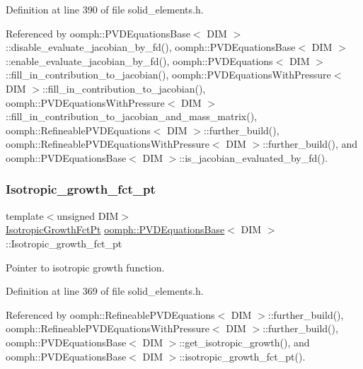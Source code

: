 Definition at line 390 of file solid\+\_\+elements.\+h.



Referenced by oomph\+::\+P\+V\+D\+Equations\+Base$<$ D\+I\+M $>$\+::disable\+\_\+evaluate\+\_\+jacobian\+\_\+by\+\_\+fd(), oomph\+::\+P\+V\+D\+Equations\+Base$<$ D\+I\+M $>$\+::enable\+\_\+evaluate\+\_\+jacobian\+\_\+by\+\_\+fd(), oomph\+::\+P\+V\+D\+Equations$<$ D\+I\+M $>$\+::fill\+\_\+in\+\_\+contribution\+\_\+to\+\_\+jacobian(), oomph\+::\+P\+V\+D\+Equations\+With\+Pressure$<$ D\+I\+M $>$\+::fill\+\_\+in\+\_\+contribution\+\_\+to\+\_\+jacobian(), oomph\+::\+P\+V\+D\+Equations\+With\+Pressure$<$ D\+I\+M $>$\+::fill\+\_\+in\+\_\+contribution\+\_\+to\+\_\+jacobian\+\_\+and\+\_\+mass\+\_\+matrix(), oomph\+::\+Refineable\+P\+V\+D\+Equations$<$ D\+I\+M $>$\+::further\+\_\+build(), oomph\+::\+Refineable\+P\+V\+D\+Equations\+With\+Pressure$<$ D\+I\+M $>$\+::further\+\_\+build(), and oomph\+::\+P\+V\+D\+Equations\+Base$<$ D\+I\+M $>$\+::is\+\_\+jacobian\+\_\+evaluated\+\_\+by\+\_\+fd().

\mbox{\label{classoomph_1_1PVDEquationsBase_a95f25d5e75bc4af1a6eeeb862546c4ea}} 
\subsubsection{\texorpdfstring{Isotropic\+\_\+growth\+\_\+fct\+\_\+pt}{Isotropic\_growth\_fct\_pt}}
{\footnotesize\ttfamily template$<$unsigned D\+IM$>$ \\
\hyperlink{classoomph_1_1PVDEquationsBase_a59fc7069e0330c399ff53aebb6c67729}{Isotropic\+Growth\+Fct\+Pt} \hyperlink{classoomph_1_1PVDEquationsBase}{oomph\+::\+P\+V\+D\+Equations\+Base}$<$ D\+IM $>$\+::Isotropic\+\_\+growth\+\_\+fct\+\_\+pt\hspace{0.3cm}{\ttfamily [protected]}}



Pointer to isotropic growth function. 



Definition at line 369 of file solid\+\_\+elements.\+h.



Referenced by oomph\+::\+Refineable\+P\+V\+D\+Equations$<$ D\+I\+M $>$\+::further\+\_\+build(), oomph\+::\+Refineable\+P\+V\+D\+Equations\+With\+Pressure$<$ D\+I\+M $>$\+::further\+\_\+build(), oomph\+::\+P\+V\+D\+Equations\+Base$<$ D\+I\+M $>$\+::get\+\_\+isotropic\+\_\+growth(), and oomph\+::\+P\+V\+D\+Equations\+Base$<$ D\+I\+M $>$\+::isotropic\+\_\+growth\+\_\+fct\+\_\+pt().

